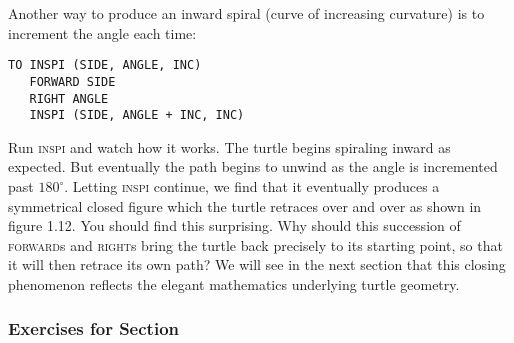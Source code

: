 \documentclass{book}
\begin{document}
Another way to produce an inward spiral (curve of increasing curvature) is to increment the angle each time:

\begin{verbatim}
TO INSPI (SIDE, ANGLE, INC)
   FORWARD SIDE
   RIGHT ANGLE
   INSPI (SIDE, ANGLE + INC, INC)
\end{verbatim}
Run \textsc{inspi} and watch how it works. The turtle begins spiraling
inward as expected. But eventually the path begins to unwind as the
angle is incremented past $180^{\circ}$. Letting \textsc{inspi} continue, we 
find that it eventually produces a symmetrical closed figure which the turtle 
retraces over and over as shown in figure 1.12. You should find this surprising.
Why should this succession of \textsc{forward}s and \textsc{right}s bring the 
turtle back precisely to its starting point, so that it will then retrace its own path?
We will see in the next section that this closing phenomenon reflects the
elegant mathematics underlying turtle geometry.

\subsubsection{Exercises for Section \thesection}
\end{document}
